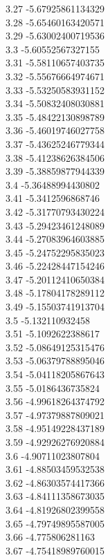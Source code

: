 {3.27	-5.67925861134329\\
3.28	-5.65460163420571\\
3.29	-5.63002400719536\\
3.3	-5.60552567327155\\
3.31	-5.58110657403735\\
3.32	-5.55676664974671\\
3.33	-5.53250583931152\\
3.34	-5.50832408030881\\
3.35	-5.48422130898789\\
3.36	-5.46019746027758\\
3.37	-5.43625246779344\\
3.38	-5.41238626384506\\
3.39	-5.38859877944339\\
3.4	-5.36488994430802\\
3.41	-5.3412596868746\\
3.42	-5.31770793430224\\
3.43	-5.29423461248089\\
3.44	-5.27083964603885\\
3.45	-5.24752295835023\\
3.46	-5.22428447154246\\
3.47	-5.20112410650384\\
3.48	-5.17804178289112\\
3.49	-5.15503741913704\\
3.5	-5.132110932458\\
3.51	-5.1092622388617\\
3.52	-5.08649125315476\\
3.53	-5.06379788895046\\
3.54	-5.04118205867643\\
3.55	-5.0186436735824\\
3.56	-4.99618264374792\\
3.57	-4.97379887809021\\
3.58	-4.95149228437189\\
3.59	-4.92926276920884\\
3.6	-4.90711023807804\\
3.61	-4.88503459532538\\
3.62	-4.86303574417366\\
3.63	-4.84111358673035\\
3.64	-4.81926802399558\\
3.65	-4.79749895587005\\
3.66	-4.775806281163\\
3.67	-4.75418989760015\\
}
